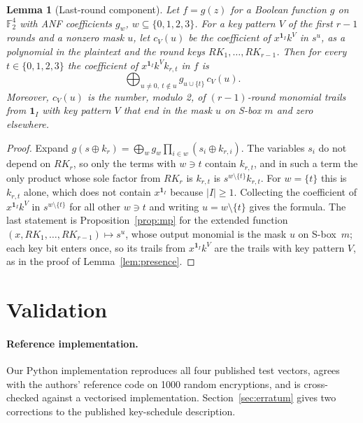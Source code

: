 \documentclass[pdflatex,sn-mathphys-num]{sn-jnl}
\theoremstyle{thmstyleone}
\newtheorem{lemma}{Lemma}
\theoremstyle{thmstylethree}
\theoremstyle{thmstyletwo}
\newcommand{\Ftwo}{\mathbb{F}_2}
\begin{document}
\begin{lemma}[Last-round component]\label{lem:component}
Let $f=g(z)$ for a Boolean function $g$ on $\Ftwo^4$ with ANF coefficients $g_w$, $w\subseteq\{0,1,2,3\}$. For a key pattern $V$ of the first $r-1$ rounds and a nonzero mask $u$, let $c_V(u)$ be the coefficient of $x^{\mathbf 1_I}k^V$ in $s^u$, as a polynomial in the plaintext and the round keys $RK_1,\dots,RK_{r-1}$. Then for every $t\in\{0,1,2,3\}$ the coefficient of $x^{\mathbf 1_I}k^{V}k_{r,t}$ in $f$ is
\[
\bigoplus_{u\neq0,\ t\notin u} g_{u\cup\{t\}}\,c_V(u).
\]
Moreover, $c_V(u)$ is the number, modulo 2, of $(r-1)$-round monomial trails from $\mathbf 1_I$ with key pattern $V$ that end in the mask $u$ on S-box $m$ and zero elsewhere.
\end{lemma}
\begin{proof}
Expand $g(s\oplus k_r)=\bigoplus_w g_w\prod_{i\in w}(s_i\oplus k_{r,i})$. The variables $s_i$ do not depend on $RK_r$, so only the terms with $w\ni t$ contain $k_{r,t}$, and in such a term the only product whose sole factor from $RK_r$ is $k_{r,t}$ is $s^{w\setminus\{t\}}k_{r,t}$. For $w=\{t\}$ this is $k_{r,t}$ alone, which does not contain $x^{\mathbf 1_I}$ because $|I|\ge1$. Collecting the coefficient of $x^{\mathbf 1_I}k^V$ in $s^{w\setminus\{t\}}$ for all other $w\ni t$ and writing $u=w\setminus\{t\}$ gives the formula. The last statement is Proposition~\ref{prop:mp} for the extended function $(x,RK_1,\dots,RK_{r-1})\mapsto s^u$, whose output monomial is the mask $u$ on S-box~$m$; each key bit enters once, so its trails from $x^{\mathbf 1_I}k^V$ are the trails with key pattern $V$, as in the proof of Lemma~\ref{lem:presence}.
\end{proof}

\section{Validation}\label{sec:validation}

\paragraph{Reference implementation.} Our Python implementation reproduces all four published test vectors, agrees with the authors' reference code on 1000 random encryptions, and is cross-checked against a vectorised implementation. Section~\ref{sec:erratum} gives two corrections to the published key-schedule description.
\end{document}
